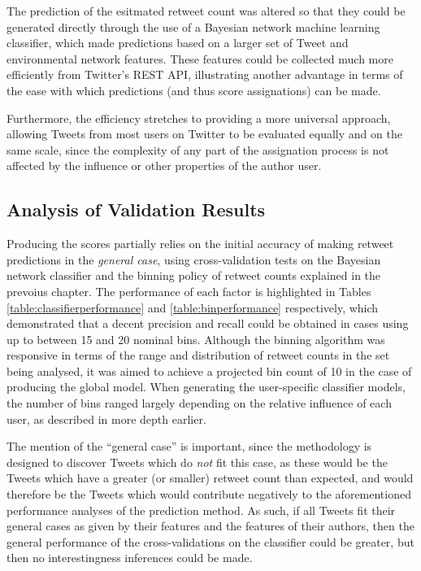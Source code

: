 The prediction of the esitmated retweet count was altered so that they could be generated directly through the use of a Bayesian network machine learning classifier, which made predictions based on a larger set of Tweet and environmental network features. These features could be collected much more efficiently from Twitter's REST API, illustrating another advantage in terms of the ease with which predictions (and thus score assignations) can be made. 

Furthermore, the efficiency stretches to providing a more universal approach, allowing Tweets from most users on Twitter to be evaluated equally and on the same scale, since the complexity of any part of the assignation process is not affected by the influence or other properties of the author user. 


\subsection{Analysis of Validation Results}
Producing the scores partially relies on the initial accuracy of making retweet predictions in the \textit{general case}, using cross-validation tests on the Bayesian network classifier and the binning policy of retweet counts explained in the prevoius chapter. The performance of each factor is highlighted in Tables \ref{table:classifierperformance} and \ref{table:binperformance} respectively, which demonstrated that a decent precision and recall could be obtained in cases using up to between 15 and 20 nominal bins. Although the binning algorithm was responsive in terms of the range and distribution of retweet counts in the set being analysed, it was aimed to achieve a projected bin count of 10 in the case of producing the global model. When generating the user-specific classifier models, the number of bins ranged largely depending on the relative influence of each user, as described in more depth earlier.

The mention of the ``general case'' is important, since the methodology is designed to discover Tweets which do \textit{not} fit this case, as these would be the Tweets which have a greater (or smaller) retweet count than expected, and would therefore be the Tweets which would contribute negatively to the aforementioned performance analyses of the prediction method. As such, if all Tweets fit their general cases as given by their features and the features of their authors, then the general performance of the cross-validations on the classifier could be greater, but then no interestingness inferences could be made.

